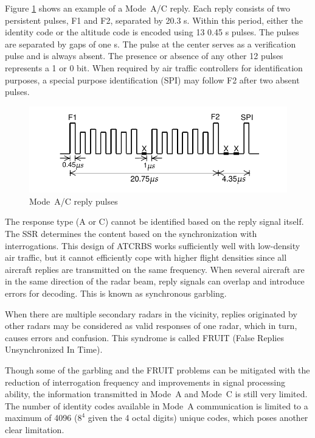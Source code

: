 Figure \ref{fig:mode_ac_downlink_pulses} shows an example of a Mode~A/C reply. Each reply consists of two persistent pulses, F1 and F2, separated by 20.3 {\textmu}s. Within this period, either the identity code or the altitude code is encoded using 13 0.45 {\textmu}s pulses. The pulses are separated by gaps of one {\textmu}s. The pulse at the center serves as a verification pulse and is always absent. The presence or absence of any other 12 pulses represents a 1 or 0 bit. When required by air traffic controllers for identification purposes, a special purpose identification (SPI) may follow F2 after two absent pulses.

\begin{figure}[ht]
  \includegraphics[scale=0.8]{figures/intro/mode_ac_downlink_pulses.pdf}
  \caption{Mode~A/C reply pulses}
  \label{fig:mode_ac_downlink_pulses}
\end{figure}

The response type (A or C) cannot be identified based on the reply signal itself. The SSR determines the content based on the synchronization with interrogations. This design of ATCRBS works sufficiently well with low-density air traffic, but it cannot efficiently cope with higher flight densities since all aircraft replies are transmitted on the same frequency. When several aircraft are in the same direction of the radar beam, reply signals can overlap and introduce errors for decoding. This is known as synchronous garbling.

When there are multiple secondary radars in the vicinity, replies originated by other radars may be considered as valid responses of one radar, which in turn, causes errors and confusion. This syndrome is called FRUIT (False Replies Unsynchronized In Time).

Though some of the garbling and the FRUIT problems can be mitigated with the reduction of interrogation frequency and improvements in signal processing ability, the information transmitted in Mode~A and Mode~C is still very limited. The number of identity codes available in Mode~A communication is limited to a maximum of 4096 ($8^4$ given the 4 octal digits) unique codes, which poses another clear limitation.

